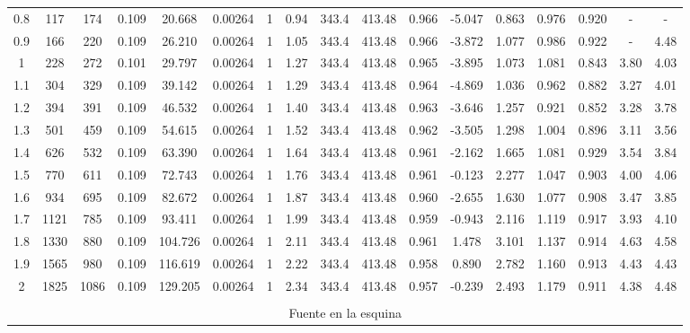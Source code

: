 \begin{landscape}
\begin{table}[ht]
{\begin{tabular}{@{}ccccccccccccccccc@{}}
0.8 & 117 & 174 & 0.109 & 20.668 & 0.00264 & 1 & 0.94 & 343.4 & 413.48 & 0.966 & -5.047 & 0.863 & 0.976 & 0.920 & - & - \\
0.9 & 166 & 220 & 0.109 & 26.210 & 0.00264 & 1 & 1.05 & 343.4 & 413.48 & 0.966 & -3.872 & 1.077 & 0.986 & 0.922 & - & 4.48 \\
1 & 228 & 272 & 0.101 & 29.797 & 0.00264 & 1 & 1.27 & 343.4 & 413.48 & 0.965 & -3.895 & 1.073 & 1.081 & 0.843 & 3.80 & 4.03 \\
1.1 & 304 & 329 & 0.109 & 39.142 & 0.00264 & 1 & 1.29 & 343.4 & 413.48 & 0.964 & -4.869 & 1.036 & 0.962 & 0.882 & 3.27 & 4.01 \\
1.2 & 394 & 391 & 0.109 & 46.532 & 0.00264 & 1 & 1.40 & 343.4 & 413.48 & 0.963 & -3.646 & 1.257 & 0.921 & 0.852 & 3.28 & 3.78 \\
1.3 & 501 & 459 & 0.109 & 54.615 & 0.00264 & 1 & 1.52 & 343.4 & 413.48 & 0.962 & -3.505 & 1.298 & 1.004 & 0.896 & 3.11 & 3.56 \\
1.4 & 626 & 532 & 0.109 & 63.390 & 0.00264 & 1 & 1.64 & 343.4 & 413.48 & 0.961 & -2.162 & 1.665 & 1.081 & 0.929 & 3.54 & 3.84 \\
1.5 & 770 & 611 & 0.109 & 72.743 & 0.00264 & 1 & 1.76 & 343.4 & 413.48 & 0.961 & -0.123 & 2.277 & 1.047 & 0.903 & 4.00 & 4.06 \\
1.6 & 934 & 695 & 0.109 & 82.672 & 0.00264 & 1 & 1.87 & 343.4 & 413.48 & 0.960 & -2.655 & 1.630 & 1.077 & 0.908 & 3.47 & 3.85 \\
1.7 & 1121 & 785 & 0.109 & 93.411 & 0.00264 & 1 & 1.99 & 343.4 & 413.48 & 0.959 & -0.943 & 2.116 & 1.119 & 0.917 & 3.93 & 4.10 \\
1.8 & 1330 & 880 & 0.109 & 104.726 & 0.00264 & 1 & 2.11 & 343.4 & 413.48 & 0.961 & 1.478 & 3.101 & 1.137 & 0.914 & 4.63 & 4.58 \\
1.9 & 1565 & 980 & 0.109 & 116.619 & 0.00264 & 1 & 2.22 & 343.4 & 413.48 & 0.958 & 0.890 & 2.782 & 1.160 & 0.913 & 4.43 & 4.43 \\
2 & 1825 & 1086 & 0.109 & 129.205 & 0.00264 & 1 & 2.34 & 343.4 & 413.48 & 0.957 & -0.239 & 2.493 & 1.179 & 0.911 & 4.38 & 4.48 \\ \bottomrule
\\
\multicolumn{17}{c}{Fuente en la esquina} \\ \toprule

\end{tabular}}
\end{table}
\end{landscape}

